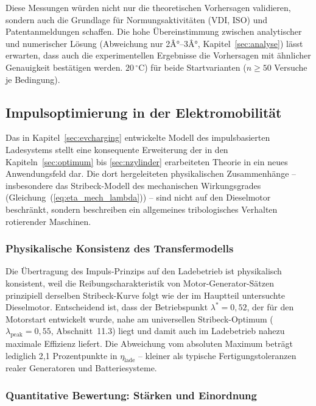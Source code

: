 ﻿\documentclass[a4paper,12pt]{article}
\begin{document}
Diese Messungen würden nicht nur die theoretischen Vorhersagen validieren,
sondern auch die Grundlage für Normungsaktivitäten (VDI, ISO) und
Patentanmeldungen schaffen. Die hohe Übereinstimmung zwischen analytischer
und numerischer Lösung (Abweichung nur 2Â°--3Â°, Kapitel~\ref{sec:analyse})
lässt erwarten, dass auch die experimentellen Ergebnisse die Vorhersagen
mit ähnlicher Genauigkeit bestätigen werden.
    $20\,^\circ\text{C}$) für beide Startvarianten ($n \geq 50$ Versuche je Bedingung).

\subsection{Impulsoptimierung in der Elektromobilität}

Das in Kapitel~\ref{sec:evcharging} entwickelte Modell des impulsbasierten
Ladesystems stellt eine konsequente Erweiterung der in den Kapiteln~\ref{sec:optimum}
bis \ref{sec:nzylinder} erarbeiteten Theorie in ein neues Anwendungsfeld dar.
Die dort hergeleiteten physikalischen Zusammenhänge -- insbesondere das
Stribeck-Modell des mechanischen Wirkungsgrades
(Gleichung~(\ref{eq:eta_mech_lambda})) -- sind nicht auf den Dieselmotor
beschränkt, sondern beschreiben ein allgemeines tribologisches Verhalten
rotierender Maschinen.

\subsubsection*{Physikalische Konsistenz des Transfermodells}

Die Übertragung des Impuls-Prinzips auf den Ladebetrieb ist physikalisch
konsistent, weil die Reibungscharakteristik von Motor-Generator-Sätzen
prinzipiell derselben Stribeck-Kurve folgt wie der im Hauptteil untersuchte
Dieselmotor. Entscheidend ist, dass der Betriebspunkt $\lambda^* = 0{,}52$,
der für den Motorstart entwickelt wurde, nahe am universellen Stribeck-Optimum
($\lambda_\text{peak} = 0{,}55$, Abschnitt~11.3) liegt und damit auch
im Ladebetrieb nahezu maximale Effizienz liefert. Die Abweichung vom absoluten
Maximum beträgt lediglich 2{,}1 Prozentpunkte in $\eta_\text{lade}$ --
kleiner als typische Fertigungstoleranzen realer Generatoren und Batteriesysteme.

\subsubsection*{Quantitative Bewertung: Stärken und Einordnung}
\end{document}

